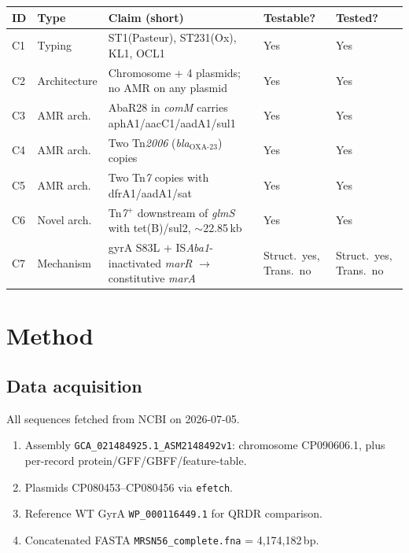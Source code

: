 \documentclass[11pt]{article}
\begin{document}
\begin{longtable}{@{}lllll@{}}
\toprule
ID & Type & Claim (short) & Testable? & Tested? \\ \midrule
C1 & Typing        & ST1(Pasteur), ST231(Ox), KL1, OCL1                                     & Yes & Yes \\
C2 & Architecture  & Chromosome + 4 plasmids; no AMR on any plasmid                         & Yes & Yes \\
C3 & AMR arch.     & AbaR28 in \emph{comM} carries aphA1/aacC1/aadA1/sul1                   & Yes & Yes \\
C4 & AMR arch.     & Two Tn\emph{2006} (\emph{bla}$_{\text{OXA-23}}$) copies                & Yes & Yes \\
C5 & AMR arch.     & Two Tn\emph{7} copies with dfrA1/aadA1/sat                             & Yes & Yes \\
C6 & Novel arch.   & Tn\emph{7}$^{+}$ downstream of \emph{glmS} with tet(B)/sul2, $\sim$22.85\,kb & Yes & Yes \\
C7 & Mechanism     & gyrA S83L + IS\emph{Aba1}-inactivated \emph{marR} $\to$ constitutive \emph{marA} &
                                                                                             Struct.~yes, Trans.~no &
                                                                                             Struct.~yes, Trans.~no \\
\bottomrule
\end{longtable}

\section{Method}

\subsection{Data acquisition}
All sequences fetched from NCBI on 2026-07-05.
\begin{enumerate}[nosep]
  \item Assembly \texttt{GCA\_021484925.1\_ASM2148492v1}: chromosome
        CP090606.1, plus per-record protein/GFF/GBFF/feature-table.
  \item Plasmids CP080453--CP080456 via \texttt{efetch}.
  \item Reference WT GyrA \texttt{WP\_000116449.1} for QRDR comparison.
  \item Concatenated FASTA \texttt{MRSN56\_complete.fna} = 4{,}174{,}182\,bp.
\end{enumerate}
\end{document}
